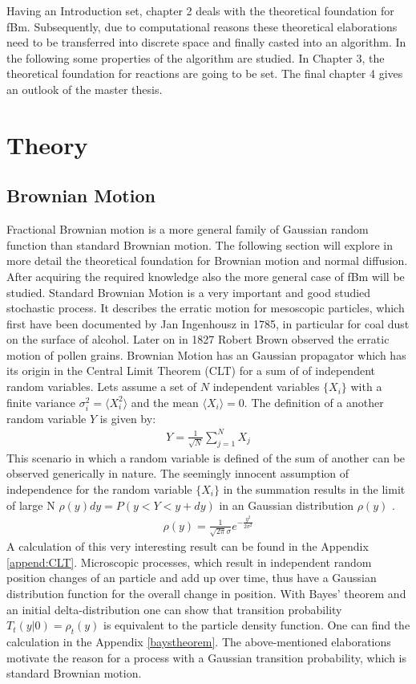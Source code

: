 \documentclass[
  a4paper,BCOR10mm,oneside,
  bibtotoc,idxtotoc,
  headsepline,footsepline,%
  fleqn,openbib
]{scrbook}
\begin{document}
Having an Introduction set, chapter 2 deals with the theoretical foundation for fBm. Subsequently, due to computational reasons these theoretical elaborations need to be transferred into discrete space and finally casted into an algorithm. In the following some properties of the algorithm are studied. In Chapter 3, the theoretical foundation for reactions are going to be set. The final chapter 4 gives an outlook of the master thesis.  

\chapter{Theory}
\section{Brownian Motion}
Fractional Brownian motion is a more general family of Gaussian random function than standard Brownian motion. The following section will explore in more detail the theoretical foundation for Brownian motion and normal diffusion. After acquiring the required knowledge also the more general case of fBm will be studied. \newline
Standard Brownian Motion is a very important and good studied stochastic process. It describes the erratic motion for mesoscopic particles, which  first have been documented by Jan Ingenhousz in 1785, in particular for coal dust on the surface of alcohol\cite{Hofling2013}. Later on in 1827 Robert Brown observed the erratic motion of pollen grains.  Brownian Motion has an Gaussian propagator which has its origin in the Central Limit Theorem (CLT) for a sum of of independent random variables. Lets assume a set of $N$ independent variables $\{X_i\}$ with a finite variance $ \sigma_i^2=\langle X_{i}^2\rangle $ and the mean $\langle X_{i}\rangle = 0$. The definition of a another random variable $Y$ is given by:
 \begin{align}
  Y = \frac{1}{\sqrt{N}} \sum_{j=1}^N X_j \label{eq:CLT}
 \end{align}
This scenario in which a random variable is defined of the sum of another can be observed generically in nature. The seemingly innocent assumption of independence for the random variable $\{X_i\}$ in the summation results in the limit of large N $\rho(y)dy=P(y<Y<y+dy)$ in an Gaussian distribution $\rho(y)$  .
\begin{align}
 \rho(y) =\frac{1}{\sqrt{2 \pi} \sigma } e^{-\frac{y^2}{2 \sigma^2}}
\end{align}
A calculation of this very interesting result can be found in the Appendix \ref{append:CLT}.    Microscopic processes, which result in independent random position changes of an particle and add up over time, thus have a Gaussian distribution function for the overall change in position. With  Bayes' theorem and an initial delta-distribution one can show that transition probability $T_{t}(y|0) = \rho_{t}(y)$ is equivalent to the particle density function. One can find the calculation in the Appendix \ref{baystheorem}. The above-mentioned elaborations motivate the reason for a process with a Gaussian transition probability, which is standard Brownian motion.
\end{document}
